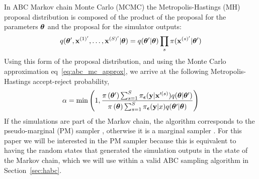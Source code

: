 \documentclass[]{article}
\begin{document}
In ABC Markov chain Monte Carlo (MCMC) \cite{marjoram2003markov,Wilkinson2013,sisson:2010} the Metropolis-Hastings (MH) proposal distribution is composed of the product of the proposal for the parameters ${\bm \theta}$ and the proposal for the simulator outputs:
\begin{equation}
  q( {\bm \theta^{\prime}}, {\bf x}^{(1)'}, \ldots, {\bf x}^{(S)'} | {\bm \theta} ) =  q( {\bm \theta^{\prime}} | {\bm \theta} ) \prod_s \pi( {\bf x}^{(s)'} | {\bm \theta^{\prime}}) \label{eq:pm-proposal}
\end{equation}
Using this form of the proposal distribution, and using the Monte Carlo approximation eq~\ref{eq:abc_mc_approx}, we arrive at the following Metropolis-Hastings accept-reject probability,
%
\begin{equation}
\alpha = \min \left( 1, \frac{\pi\left({\bm \theta^{\prime}}\right) \sum_{s=1}^S \pi_{{\bm {\epsilon}}}({\bf y} | {\bf x}^{\prime(s)} )  q( {\bm \theta} | {\bm \theta^{\prime}} )}{\pi\left({\bm \theta}\right) \sum_{s=1}^S \pi_{{\bm {\epsilon}}}({\bf y} | x ) q( {\bm \theta^{\prime}} | {\bm \theta} )} \right) \label{eq:abc_mh_acceptance_with_s}
\end{equation}
%
If the simulations are part of the Markov chain, the algorithm corresponds to the pseudo-marginal (PM) sampler \cite{andrieu2009pseudo}, otherwise it is a marginal sampler \cite{marjoram2003markov,sisson:2010}.   For this paper we will be interested in the PM sampler because this is equivalent to having the random states that generated the simulation outputs in the state of the Markov chain, which we will use within a valid ABC sampling algorithm in Section~\ref{sec:habc}.
%
\end{document}

